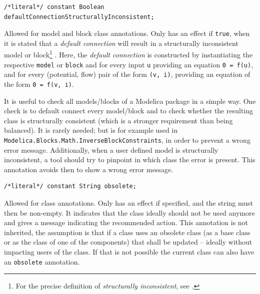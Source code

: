 \begin{annotationdefinition}[defaultConnectionStructurallyInconsistent]
\begin{synopsis}\begin{lstlisting}
/*literal*/ constant Boolean defaultConnectionStructurallyInconsistent;
\end{lstlisting}\end{synopsis}
\begin{semantics}
Allowed for model and block class annotations.
Only has an effect if \lstinline!true!, when it is stated that a \emph{default connection} will result in a structurally inconsistent model or block\footnote{%
  For the precise definition of \emph{structurally inconsistent}, see \textcite{Pantelides1988ConsistentInitialization}.}%
.
Here, the \emph{default connection} is constructed by instantiating the respective \lstinline!model! or \lstinline!block! and for every input \lstinline!u! providing an equation \lstinline!0 = f(u)!, and for every (potential, flow) pair of the form \lstinline!(v, i)!, providing an equation of the form \lstinline!0 = f(v, i)!.

\begin{nonnormative}
It is useful to check all models/blocks of a Modelica package in a simple way.
One check is to default connect every model/block and to check whether the resulting class is structurally consistent (which is a stronger requirement than being balanced).
It is rarely needed; but is for example used in \lstinline!Modelica.Blocks.Math.InverseBlockConstraints!, in order to prevent a wrong error message.
Additionally, when a user defined model is structurally inconsistent, a tool should try to pinpoint in which class the error is present.
This annotation avoids then to show a wrong error message.
\end{nonnormative}
\end{semantics}
\end{annotationdefinition}

\begin{annotationdefinition}[obsolete]
\begin{synopsis}\begin{lstlisting}
/*literal*/ constant String obsolete;
\end{lstlisting}\end{synopsis}
\begin{semantics}
Allowed for class annotations.
Only has an effect if specified, and the string must then be non-empty.
It indicates that the class ideally should not be used anymore and gives a message indicating the recommended action.
This annotation is not inherited, the assumption is that if a class uses an obsolete class (as a base class or as the class of one of the components) that shall be updated -- ideally without impacting users of the class.
If that is not possible the current class can also have an \lstinline!obsolete! annotation.
\end{semantics}
\end{annotationdefinition}

